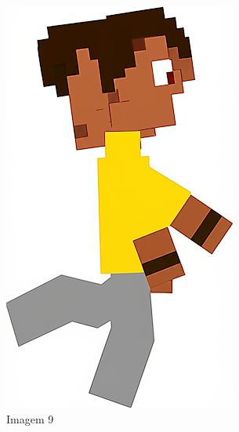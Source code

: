 \begin{figure}[htbp]
\begin{subfigure}{0.23\linewidth}
        \includegraphics[width=1\linewidth]{figs/geminiPro/chat10/tela1_res2_9.PNG}
        \caption{\small Imagem 9}
        \label{fig:geminiProSheet5_2i}
    \end{subfigure}
    \begin{subfigure}{0.23\linewidth}

\end{subfigure}
\end{figure}
